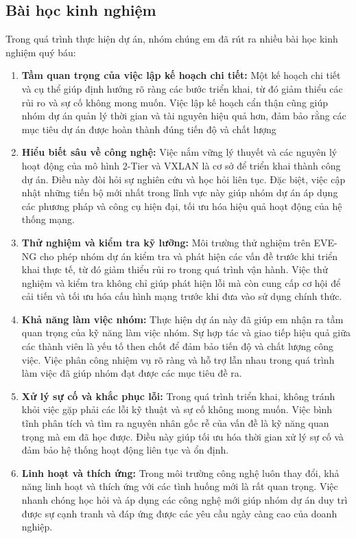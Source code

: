 \documentclass[13pt]{article}
\begin{document}
\subsection{Bài học kinh nghiệm}

Trong quá trình thực hiện dự án, nhóm chúng em đã rút ra nhiều bài học kinh nghiệm quý báu:

\begin{enumerate}
    \item \textbf{Tầm quan trọng của việc lập kế hoạch chi tiết: }Một kế hoạch chi tiết và cụ thể giúp định hướng rõ ràng các bước triển khai, từ đó giảm thiểu các rủi ro và sự cố không mong muốn. Việc lập kế hoạch cẩn thận cũng giúp nhóm dự án quản lý thời gian và tài nguyên hiệu quả hơn, đảm bảo rằng các mục tiêu dự án được hoàn thành đúng tiến độ và chất lượng
    \item \textbf{Hiểu biết sâu về công nghệ: }Việc nắm vững lý thuyết và các nguyên lý hoạt động của mô hình 2-Tier và VXLAN là cơ sở để triển khai thành công dự án. Điều này đòi hỏi sự nghiên cứu và học hỏi liên tục. Đặc biệt, việc cập nhật những tiến bộ mới nhất trong lĩnh vực này giúp nhóm dự án áp dụng các phương pháp và công cụ hiện đại, tối ưu hóa hiệu quả hoạt động của hệ thống mạng.
    \item \textbf{Thử nghiệm và kiểm tra kỹ lưỡng: }Môi trường thử nghiệm trên EVE-NG cho phép nhóm dự án kiểm tra và phát hiện các vấn đề trước khi triển khai thực tế, từ đó giảm thiểu rủi ro trong quá trình vận hành. Việc thử nghiệm và kiểm tra không chỉ giúp phát hiện lỗi mà còn cung cấp cơ hội để cải tiến và tối ưu hóa cấu hình mạng trước khi đưa vào sử dụng chính thức.
    \item \textbf{Khả năng làm việc nhóm: }Thực hiện dự án này đã giúp em nhận ra tầm quan trọng của kỹ năng làm việc nhóm. Sự hợp tác và giao tiếp hiệu quả giữa các thành viên là yếu tố then chốt để đảm bảo tiến độ và chất lượng công việc. Việc phân công nhiệm vụ rõ ràng và hỗ trợ lẫn nhau trong quá trình làm việc đã giúp nhóm đạt được các mục tiêu đề ra.
    \item \textbf{Xử lý sự cố và khắc phục lỗi: }Trong quá trình triển khai, không tránh khỏi việc gặp phải các lỗi kỹ thuật và sự cố không mong muốn. Việc bình tĩnh phân tích và tìm ra nguyên nhân gốc rễ của vấn đề là kỹ năng quan trọng mà em đã học được. Điều này giúp tối ưu hóa thời gian xử lý sự cố và đảm bảo hệ thống hoạt động liên tục và ổn định.
    \item \textbf{ Linh hoạt và thích ứng: }Trong môi trường công nghệ luôn thay đổi, khả năng linh hoạt và thích ứng với các tình huống mới là rất quan trọng. Việc nhanh chóng học hỏi và áp dụng các công nghệ mới giúp nhóm dự án duy trì được sự cạnh tranh và đáp ứng được các yêu cầu ngày càng cao của doanh nghiệp.
\end{enumerate}
\end{document}
